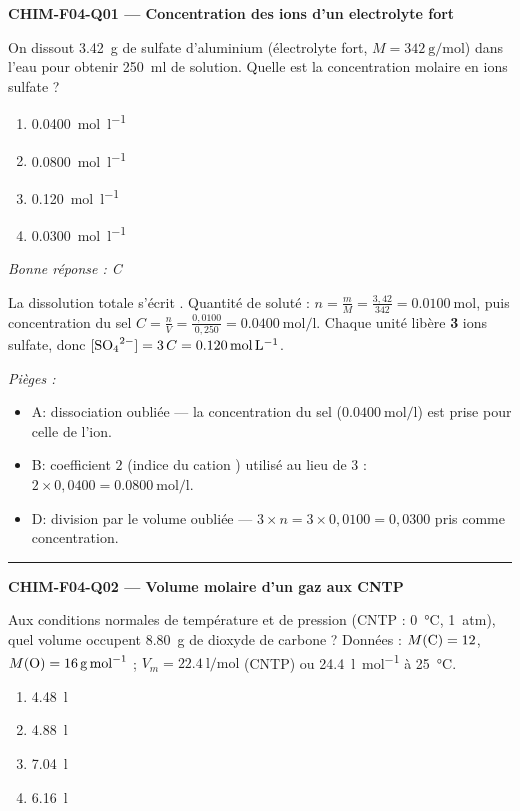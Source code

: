 \documentclass[11pt,a4paper]{article}
\begin{document}
\noindent\textbf{CHIM-F04-Q01 --- Concentration des ions d'un electrolyte fort}\par
On dissout \qty{3.42}{\gram} de sulfate d'aluminium  (électrolyte fort, $M = \qty{342}{\gram\per\mole}$) dans l'eau pour obtenir \qty{250}{\milli\litre} de solution. Quelle est la concentration molaire en ions sulfate  ?
\begin{enumerate}[label=\Alph*)]
\item \qty{0.0400}{\mole\per\litre}
\item \qty{0.0800}{\mole\per\litre}
\item \qty{0.120}{\mole\per\litre}
\item \qty{0.0300}{\mole\per\litre}
\end{enumerate}
\textit{Bonne réponse : C}\par
La dissolution totale s'écrit . Quantité de soluté : $n = \frac{m}{M} = \frac{3{,}42}{342} = \qty{0.0100}{\mole}$, puis concentration du sel $C = \frac{n}{V} = \frac{0{,}0100}{0{,}250} = \qty{0.0400}{\mole\per\litre}$. Chaque unité libère \textbf{3} ions sulfate, donc $[\ce{SO4^2-}] = 3\,C = \qty{0.120}{\mole\per\litre}$.\par
\textit{Pièges :}
\begin{itemize}
\item A: dissociation oubliée --- la concentration du sel ($\qty{0.0400}{\mole\per\litre}$) est prise pour celle de l'ion.
\item B: coefficient $2$ (indice du cation ) utilisé au lieu de $3$ : $2\times 0{,}0400 = \qty{0.0800}{\mole\per\litre}$.
\item D: division par le volume oubliée --- $3\times n = 3\times 0{,}0100 = 0{,}0300$ pris comme concentration.
\end{itemize}
\vspace{8pt}\hrule\vspace{8pt}
\noindent\textbf{CHIM-F04-Q02 --- Volume molaire d'un gaz aux CNTP}\par
Aux conditions normales de température et de pression (CNTP : \qty{0}{\celsius}, \num{1}~atm), quel volume occupent \qty{8.80}{\gram} de dioxyde de carbone  ? Données : $M(\ce{C}) = 12$, $M(\ce{O}) = \qty{16}{\gram\per\mole}$ ; $V_m = \qty{22.4}{\litre\per\mole}$ (CNTP) ou \qty{24.4}{\litre\per\mole} à \qty{25}{\celsius}.
\begin{enumerate}[label=\Alph*)]
\item \qty{4.48}{\litre}
\item \qty{4.88}{\litre}
\item \qty{7.04}{\litre}
\item \qty{6.16}{\litre}
\end{enumerate}
\end{document}
